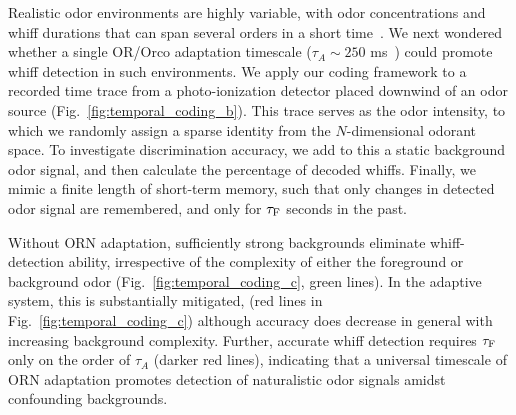 \documentclass[9pt,twocolumn,twoside,lineno]{pnas-new}
\begin{document}
Realistic odor environments are highly variable, with odor concentrations and whiff durations that can span several orders in a short time~\cite{celani}. We next wondered whether a single OR/Orco adaptation timescale ($\tau_{A} \sim 250$ ms~\cite{srinivas_elife}) could promote whiff detection in such environments. We apply our coding framework to a recorded time trace from a photo-ionization detector placed downwind of an odor source (Fig.~\ref{fig:temporal_coding_b}). This trace serves as the odor intensity, to which we randomly assign a sparse identity from the $N$-dimensional odorant space. To investigate discrimination accuracy, we add to this a static background odor signal, and then calculate the percentage of decoded whiffs. Finally, we mimic a finite length of short-term memory, such that only changes in detected odor signal are remembered, and  only for $\tau_{\textup {F}}$ seconds in the past. 

Without ORN adaptation, sufficiently strong backgrounds eliminate whiff-detection ability, irrespective of the complexity of either the foreground or background odor (Fig.~\ref{fig:temporal_coding_c}, green lines). In the adaptive system, this is substantially mitigated, (red lines in Fig.~\ref{fig:temporal_coding_c}) although accuracy does decrease in general with increasing background complexity. Further, accurate whiff detection requires $\tau_{\textup {F}}$ only on the order of $\tau_A$ (darker red lines), indicating that a universal timescale of ORN adaptation promotes detection of naturalistic odor signals amidst confounding backgrounds.




\end{document}
